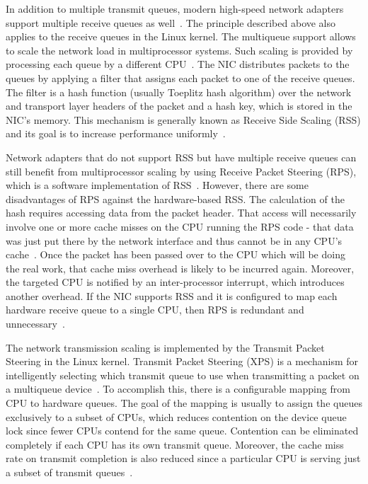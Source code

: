 In addition to multiple transmit queues,
modern high-speed network adapters support multiple receive queues as well~\cite{mellanox-product-brief}.
The principle described above also applies to the receive queues in the Linux kernel.
The multiqueue support allows to scale the network load in multiprocessor systems.
Such scaling is provided by processing each queue by a different CPU~\cite{kernel-doc-scaling}.
The NIC distributes packets to the queues by applying a filter that assigns each packet to one of the receive queues.
The filter is a hash function (usually Toeplitz hash algorithm) over the network and transport layer headers of the packet
and a hash key, which is stored in the NIC's memory.
This mechanism is generally known as Receive Side Scaling (RSS)
and its goal is to increase performance uniformly~\cite{kernel-doc-scaling}.

Network adapters that do not support RSS but have multiple receive queues can still benefit from multiprocessor scaling
by using Receive Packet Steering (RPS), which is a software implementation of RSS~\cite{kernel-doc-scaling}.
However, there are some disadvantages of RPS against the hardware-based RSS.
The calculation of the hash requires accessing data from the packet header.
That access will necessarily involve one or more cache misses on the CPU running the RPS code -
that data was just put there by the network interface and thus cannot be in any CPU's cache~\cite{receive-packet-steering}.
Once the packet has been passed over to the CPU which will be doing the real work,
that cache miss overhead is likely to be incurred again.
Moreover, the targeted CPU is notified by an inter-processor interrupt,
which introduces another overhead.
If the NIC supports RSS and it is configured to map each hardware
receive queue to a single CPU, then RPS is redundant and unnecessary~\cite{kernel-doc-scaling}.

The network transmission scaling is implemented by the
Transmit Packet Steering in the Linux kernel.
Transmit Packet Steering (XPS) is a mechanism for intelligently selecting
which transmit queue to use when transmitting a packet on a multiqueue device~\cite{kernel-source}.
To accomplish this, there is a configurable mapping from CPU to hardware queues.
The goal of the mapping is usually to assign the queues exclusively to a subset of CPUs, which reduces
contention on the device queue lock since fewer CPUs contend for the same queue.
Contention can be eliminated completely if each CPU has its own transmit queue.
Moreover, the cache miss rate on transmit completion is also reduced since a particular CPU
is serving just a subset of transmit queues~\cite{kernel-doc-scaling}.


